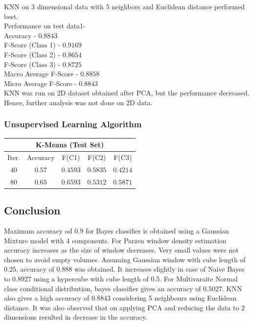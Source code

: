 \documentclass[12pt,journal,compsoc]{IEEEtran}
\begin{document}
KNN on $3$ dimensional data with $5$ neighbors and Euclidean distance performed best.\\
Performance on test data1-\\ 
Accuracy - $0.8843$\\ F-Score (Class 1) - $0.9169$\\
F-Score (Class 2) - $0.8654$\\ F-Score (Class 3) - $0.8725$\\ Macro Average F-Score - $0.8858$\\
Micro Average F-Score - $0.8843$\\
KNN was run on 2D dataset obtained after PCA, but the performance decreased. Hence, further analysis was not done on 2D data.
\subsubsection{Unsupervised Learning Algorithm}
\vspace*{0.1 cm}
\begin{center}
\begin{tabular}{|c|c|c|c|c|}
\multicolumn{5}{c}{K-Means (Test Set)}\\
\hline
Iter. & Accuracy & F(C1) & F(C2) & F(C3)\\
\hline
$40$ &$0.57$ &$0.4593$ &$0.5835$ &$0.4214$\\
\hline
$80$ &$0.65$ &$0.6593$ &$0.5312$ &$0.5871$\\
\hline
\end{tabular}
\end{center}
\subsection{Conclusion}
\noindent Maximum accuracy od $0.9$ for Bayes classifier is obtained using a Gaussian Mixture model with 4 components. For Parzen window density estimation accuracy increases as the size of window decreases. Very small values were not chosen to avoid empty volumes. Assuming Gaussian window with cube length of $0.25$, accuracy of 0.888 was obtained. It increases slightly in case of Naive Bayes to $0.8927$ using a hypercube with cube length of 0.5. For Multivaraite Normal class conditional distribution, bayes classifier gives an accuracy of $0.5027$. KNN also gives a high accuracy of 0.8843 considering 5 neighbours using Euclidean distance. It was also observed that on applying PCA and reducing the data to 2 dimensions resulted in decrease in the accuracy. 
\end{document}
